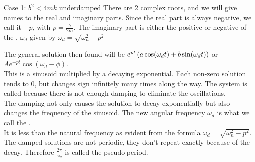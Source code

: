 \documentclass[11pt, openright]{book}
\begin{document}
\begin{dent}{Case 1: $b^2<4mk$ underdamped} There are 2 complex roots, and we will give names to the real and imaginary parts. Since the real part is always negative, we call it $-p$, with $p=\frac{b}{2m}$. The imaginary part is either the positive or negative of the , $\omega_d$ given by $\omega_d=\sqrt{\omega_{n}^2-p^2}$

    The general solution then found will be $e^{pt}\left( a\cos(\omega_d t)+b\sin(\omega_d t) \right)$ or $Ae^{-pt}\cos(\omega_d -\phi)$.\\
    This is a sinusoid multiplied by a decaying exponential. Each non-zero solution tends to 0, but changes sign infinitely many times along the way. The system is called  because there is not enough damping to eliminate the oscillations.\\
    The damping not only causes the solution to decay exponentially but also changes the frequency of the sinusoid. The new angular frequency $\omega_d$ is what we call the .\\
    It is less than the natural frequency as evident from the formula $\omega_d=\sqrt{\omega_{n}^2-p^2}$.\\
    The damped solutions are not periodic, they don't repeat exactly because of the decay. Therefore $\frac{2\pi}{\omega_d}$ is called the pseudo period.

\end{dent}
\begin{figure}[ht]
    \centering
\end{figure}
\end{document}
